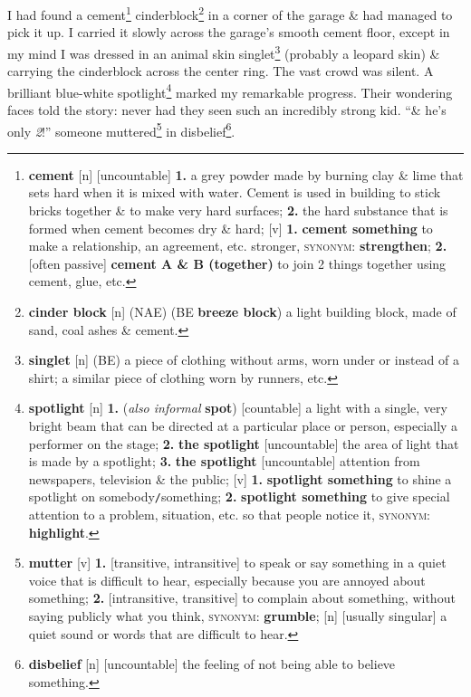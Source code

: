 \documentclass[oneside]{book}
\numberwithin{equation}{section}
\begin{document}
I had found a cement\footnote{\textbf{cement} [n] [uncountable] \textbf{1.} a grey powder made by burning clay \& lime that sets hard when it is mixed with water. Cement is used in building to stick bricks together \& to make very hard surfaces; \textbf{2.} the hard substance that is formed when cement becomes dry \& hard; [v] \textbf{1.} \textbf{cement something} to make a relationship, an agreement, etc. stronger, \textsc{synonym}: \textbf{strengthen}; \textbf{2.} [often passive] \textbf{cement A \& B (together)} to join 2 things together using cement, glue, etc.} cinderblock\footnote{\textbf{cinder block} [n] (NAE) (BE \textbf{breeze block}) a light building block, made of sand, coal ashes \& cement.} in a corner of the garage \& had managed to pick it up. I carried it slowly across the garage's smooth cement floor, except in my mind I was dressed in an animal skin singlet\footnote{\textbf{singlet} [n] (BE) a piece of clothing without arms, worn under or instead of a shirt; a similar piece of clothing worn by runners, etc.} (probably a leopard skin) \& carrying the cinderblock across the center ring. The vast crowd was silent. A brilliant blue-white spotlight\footnote{\textbf{spotlight} [n] \textbf{1.} (\textit{also informal} \textbf{spot}) [countable] a light with a single, very bright beam that can be directed at a particular place or person, especially a performer on the stage; \textbf{2.} \textbf{the spotlight} [uncountable] the area of light that is made by a spotlight; \textbf{3.} \textbf{the spotlight} [uncountable] attention from newspapers, television \& the public; [v] \textbf{1.} \textbf{spotlight something} to shine a spotlight on somebody\texttt{/}something; \textbf{2.} \textbf{spotlight something} to give special attention to a problem, situation, etc. so that people notice it, \textsc{synonym}: \textbf{highlight}.} marked my remarkable progress. Their wondering faces told the story: never had they seen such an incredibly strong kid. ``\& he's only \textit{2}!'' someone muttered\footnote{\textbf{mutter} [v] \textbf{1.} [transitive, intransitive] to speak or say something in a quiet voice that is difficult to hear, especially because you are annoyed about something; \textbf{2.} [intransitive, transitive] to complain about something, without saying publicly what you think, \textsc{synonym}: \textbf{grumble}; [n] [usually singular] a quiet sound or words that are difficult to hear.} in disbelief\footnote{\textbf{disbelief} [n] [uncountable] the feeling of not being able to believe something.}.
\end{document}
